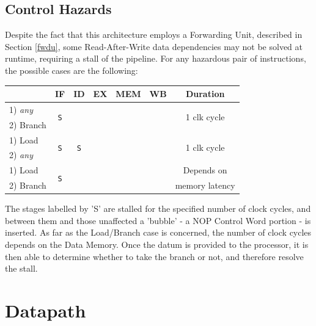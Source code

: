 \documentclass[10pt,  english, makeidx, a4paper, titlepage, oneside]{book}
\begin{document}
\section{Control Hazards}
Despite the fact that this architecture employs a Forwarding Unit, described in Section \ref{fwdu}, some Read-After-Write data dependencies may not be solved at runtime, requiring a stall of the pipeline. For any hazardous pair of instructions, the possible cases are the following:
\vspace{0.5cm}
\begin{center}
    \begin{tabular}{l||c|c|c|c|c|c}
        
         & \textbf{IF} & \textbf{ID} & \textbf{EX} & \textbf{MEM} & \textbf{WB} & \textbf{Duration} \\
        \hline
        \hline
        1) \textit{any} & \multirow{2}{*}{\texttt{S}} & & & & & \multirow{2}{*}{1 clk cycle} \\
        2) Branch & & & & & \\ 
        \hline
        1) Load & \multirow{2}{*}{\texttt{S}} & \multirow{2}{*}{\texttt{S}} & & & & \multirow{2}{*}{1 clk cycle} \\
        2) \textit{any} & & & & & \\ 
        \hline
        1) Load & \multirow{2}{*}{\texttt{S}} & & & & & Depends on \\
        2) Branch & & & & & & memory latency \\ 
        
    \end{tabular}{}
    
\end{center}{}

\vspace{0.5cm}
The stages labelled by 'S' are stalled for the specified number of clock cycles, and between them and those unaffected a 'bubble' - a NOP Control Word portion - is inserted. As far as the Load/Branch case is concerned, the number of clock cycles depends on the Data Memory. Once the datum is provided to the processor, it is then able to determine whether to take the branch or not, and therefore resolve the stall. 

\chapter{Datapath}
\end{document}
